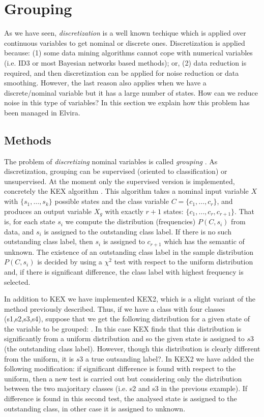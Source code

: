 \section{Grouping}

As we have seen, {\em discretization} is a well known techique which is
applied over continuous variables to get nominal or discrete ones. 
Discretization is applied because: (1) some data mining algorithms cannot
cope with numerical variables (i.e. ID3 or most Bayesian networks based
methods); or, (2) data reduction is required, and then discretization can
be applied for noise reduction or data smoothing. However, the last reason
also applies when we have a discrete/nominal variable but it has a large
number of states. How can we reduce noise in this type of variables?
In this section we explain how this problem has been managed in Elvira.

\subsection{Methods}

The problem of {\em discretizing} nominal variables is called {\em grouping}
\cite{BerkaBruha98}. As discretization, grouping can be supervised 
(oriented to classification) or unsupervised. At the moment only
the supervised version is implemented, concretely the KEX algorithm 
\cite{BerkaBruha98}. This algorithm takes a nominal
input variable $X$ with $\{s_1, \dots, s_k\}$ possible states and the 
class variable $C = \{c_1,\dots,c_r\}$, and produces an output variable
$X_g$ with exactly $r+1$ states: $\{c_1,\dots,c_r,c_{r+1}\}$. That is,
for each state $s_i$ we compute the distribution (frequencies) $P(C,s_i)$ from data,
and $s_i$ is assigned to the outstanding class label. If there is no such
outstanding class label, then $s_i$ is assigned to $c_{r+1}$ which has
the semantic of {\sf unknown}. The existence of an outstanding class label
in the sample distribution $P(C,s_i)$ is decided by using a $\chi^2$ test with respect to the uniform distribution and, if there is significant difference, the class label with highest frequency is selected.

In addition to KEX we have implemented KEX2, which is a slight variant of the method previously described. Thus, if we have a class with four classes (s1,s2,s3,s4), suppose that we get the following distribution for a given state of the variable to be grouped: {\sf [0,30,32,2]}. In this case KEX finds that this distribution is significantly from a uniform distribution and so the given state is assigned to $s3$ (the outstanding class label). However, though this distribution is clearly different from the uniform, it is $s3$ a true outsanding label?. In KEX2 we have added the following modification: if significant difference is found with respect to the uniform, then a new test is carried out but considering only the distribution between the two majoritary classes (i.e. s2 and s3 in the previous example). If difference is found in this second test, the analysed state is assigned to the outstanding class,
in other case it is assigned to {\sf unknown}.


